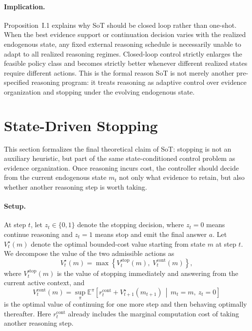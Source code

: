\paragraph{Implication.}
Proposition~I.1 explains why SoT should be closed loop rather than one-shot.
When the best evidence support or continuation decision varies with the realized endogenous state, any fixed external reasoning schedule is necessarily unable to adapt to all realized reasoning regimes.
Closed-loop control strictly enlarges the feasible policy class and becomes strictly better whenever different realized states require different actions.
This is the formal reason SoT is not merely another pre-specified reasoning program: it treats reasoning as adaptive control over evidence organization and stopping under the evolving endogenous state.

\section{State-Driven Stopping}
\label{app:theory_stop}

This section formalizes the final theoretical claim of SoT:
stopping is not an auxiliary heuristic, but part of the same state-conditioned control problem as evidence organization.
Once reasoning incurs cost, the controller should decide from the current endogenous state \(m_t\) not only what evidence to retain, but also whether another reasoning step is worth taking.

\paragraph{Setup.}
At step \(t\), let \(z_t\in\{0,1\}\) denote the stopping decision, where \(z_t=0\) means continue reasoning and \(z_t=1\) means stop and emit the final answer \(a\).
Let \(V_t^{\star}(m)\) denote the optimal bounded-cost value starting from state \(m\) at step \(t\).
We decompose the value of the two admissible actions as
\begin{equation}
V_t^{\star}(m)
=
\max\!\left\{
V_t^{\mathrm{stop}}(m),\;
V_t^{\mathrm{cont}}(m)
\right\},
\label{eq:app_stop_bellman}
\end{equation}
where \(V_t^{\mathrm{stop}}(m)\) is the value of stopping immediately and answering from the current active context, and
\begin{equation}
V_t^{\mathrm{cont}}(m)
=
\sup_{\pi}
\mathbb{E}^{\pi}\!\left[
r_t^{\mathrm{cont}}
+
V_{t+1}^{\star}(m_{t+1})
\,\middle|\, m_t=m,\ z_t=0
\right]
\label{eq:app_stop_continue}
\end{equation}
is the optimal value of continuing for one more step and then behaving optimally thereafter.
Here \(r_t^{\mathrm{cont}}\) already includes the marginal computation cost of taking another reasoning step.

